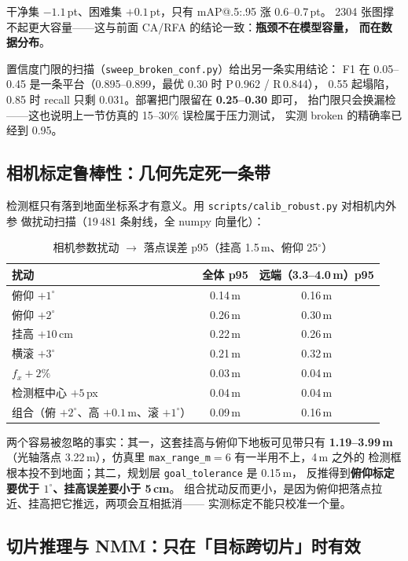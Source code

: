 \documentclass[UTF8,a4paper,11pt]{ctexart}
\begin{document}
干净集 $-1.1$\,pt、困难集 $+0.1$\,pt，只有 mAP@.5:.95 涨 0.6--0.7\,pt。
2304 张图撑不起更大容量——这与前面 CA/RFA 的结论一致：\textbf{瓶颈不在模型容量，
而在数据分布}。

置信度门限的扫描（\texttt{sweep\_broken\_conf.py}）给出另一条实用结论：
F1 在 0.05--0.45 是一条平台（0.895--0.899，最优 0.30 时 P\,0.962 / R\,0.844），
0.55 起塌陷，0.85 时 recall 只剩 0.031。部署把门限留在 \textbf{0.25--0.30} 即可，
抬门限只会换漏检——这也说明上一节仿真的 15--30\% 误检属于压力测试，
实测 broken 的精确率已经到 0.95。

\subsection{相机标定鲁棒性：几何先定死一条带}

检测框只有落到地面坐标系才有意义。用 \texttt{scripts/calib\_robust.py} 对相机内外参
做扰动扫描（19\,481 条射线，全 numpy 向量化）：

\begin{table}[htbp]
  \centering
  \caption{相机参数扰动 $\rightarrow$ 落点误差 p95（挂高 1.5\,m、俯仰 25$^\circ$）}
  \label{tab:calib}
  \begin{tabular}{lcc}
    \toprule
    扰动 & 全体 p95 & 远端（3.3--4.0\,m）p95 \\
    \midrule
    俯仰 $+1^\circ$ & 0.14\,m & 0.16\,m \\
    俯仰 $+2^\circ$ & 0.26\,m & 0.30\,m \\
    挂高 $+10$\,cm & 0.22\,m & 0.26\,m \\
    横滚 $+3^\circ$ & 0.21\,m & 0.32\,m \\
    $f_x +2\%$ & 0.03\,m & 0.04\,m \\
    检测框中心 $+5$\,px & 0.04\,m & 0.04\,m \\
    组合（俯 $+2^\circ$、高 $+0.1$\,m、滚 $+1^\circ$） & 0.09\,m & 0.16\,m \\
    \bottomrule
  \end{tabular}
\end{table}

两个容易被忽略的事实：其一，这套挂高与俯仰下地板可见带只有 \textbf{1.19--3.99\,m}
（光轴落点 3.22\,m），仿真里 \texttt{max\_range\_m}$=6$ 有一半用不上，4\,m 之外的
检测框根本投不到地面；其二，规划层 \texttt{goal\_tolerance} 是 0.15\,m，
反推得到\textbf{俯仰标定要优于 $1^\circ$、挂高误差要小于 5\,cm}。
组合扰动反而更小，是因为俯仰把落点拉近、挂高把它推远，两项会互相抵消——
实测标定不能只校准一个量。

\subsection{切片推理与 NMM：只在「目标跨切片」时有效}
\end{document}
